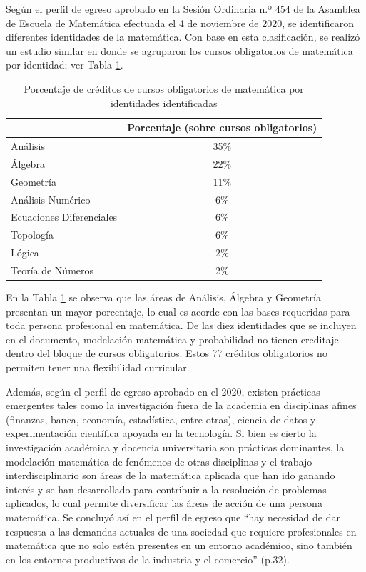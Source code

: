\begin{refsection}
Según el perfil de egreso aprobado en la Sesión Ordinaria n.º 454 de la Asamblea de Escuela de Matemática efectuada el 4 de noviembre de 2020, se identificaron diferentes identidades de la matemática. Con base en esta clasificación, se realizó un estudio similar en donde se agruparon los cursos obligatorios de matemática por identidad; ver Tabla \ref{Tabla4.2}.

\begin{table}[H]
\begin{center}
\begin{tabular}[c]{|l|c|}
\hline
\rowcolor[HTML]{00C0F3}
\multicolumn{1}{|c|}{\textbf{Identidad}} & \multicolumn{1}{c|}{\cellcolor[HTML]{00C0F3} \textbf{Porcentaje (sobre cursos obligatorios)}} \\ \hline
Análisis & 35\% \\ \hline
Álgebra & 22\% \\ \hline
Geometría & 11\% \\ \hline
Análisis Numérico & 6\% \\ \hline
Ecuaciones Diferenciales & 6\% \\ \hline
Topología & 6\% \\ \hline
Lógica & 2\% \\ \hline
Teoría de Números & 2\% \\ \hline
\end{tabular}
\end{center}
\caption{Porcentaje de créditos de cursos obligatorios de matemática por identidades identificadas}
\label{Tabla4.2}
\end{table}

En la Tabla \ref{Tabla4.2} se observa que las áreas de Análisis, Álgebra y Geometría presentan un mayor porcentaje, lo cual es acorde con las bases requeridas para toda persona profesional en matemática. De las diez identidades que se incluyen en el documento, modelación matemática y probabilidad no tienen creditaje dentro del bloque de cursos obligatorios. Estos 77 créditos obligatorios no permiten tener una flexibilidad curricular.

Además, según el perfil de egreso aprobado en el 2020, existen prácticas emergentes tales como la investigación fuera de la academia en disciplinas afines (finanzas, banca, economía, estadística, entre otras), ciencia de datos y experimentación científica apoyada en la tecnología. Si bien es cierto la investigación académica y docencia universitaria son prácticas dominantes, la modelación matemática de fenómenos de otras disciplinas y el trabajo interdisciplinario son áreas de la matemática aplicada que han ido ganando interés y se han desarrollado para contribuir a la resolución de problemas aplicados, lo cual permite diversificar las áreas de acción de una persona matemática. Se concluyó así en el perfil de
egreso que “hay necesidad de dar respuesta a las demandas actuales de una sociedad que requiere profesionales en matemática que no solo estén presentes en un entorno académico, sino también en los entornos productivos de la industria y el comercio” (p.32).


\end{refsection}
